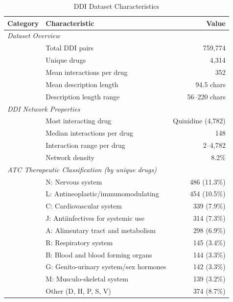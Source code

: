 \documentclass[11pt]{article}
\begin{document}
\begin{table}[H]
\centering
\caption{DDI Dataset Characteristics}
\label{tab:characteristics}
\begin{tabular}{llr}
\toprule
\textbf{Category} & \textbf{Characteristic} & \textbf{Value} \\
\midrule
\multicolumn{3}{l}{\textit{Dataset Overview}} \\
& Total DDI pairs & 759,774 \\
& Unique drugs & 4,314 \\
& Mean interactions per drug & 352 \\
& Mean description length & 94.5 chars \\
& Description length range & 56--220 chars \\
\midrule
\multicolumn{3}{l}{\textit{DDI Network Properties}} \\
& Most interacting drug & Quinidine (4,782) \\
& Median interactions per drug & 148 \\
& Interaction range per drug & 2--4,782 \\
& Network density & 8.2\% \\
\midrule
\multicolumn{3}{l}{\textit{ATC Therapeutic Classification (by unique drugs)}} \\
& N: Nervous system & 486 (11.3\%) \\
& L: Antineoplastic/immunomodulating & 454 (10.5\%) \\
& C: Cardiovascular system & 339 (7.9\%) \\
& J: Antiinfectives for systemic use & 314 (7.3\%) \\
& A: Alimentary tract and metabolism & 298 (6.9\%) \\
& R: Respiratory system & 145 (3.4\%) \\
& B: Blood and blood forming organs & 144 (3.3\%) \\
& G: Genito-urinary system/sex hormones & 142 (3.3\%) \\
& M: Musculo-skeletal system & 139 (3.2\%) \\
& Other (D, H, P, S, V) & 374 (8.7\%) \\
\bottomrule
\end{tabular}
\end{table}
\end{document}
